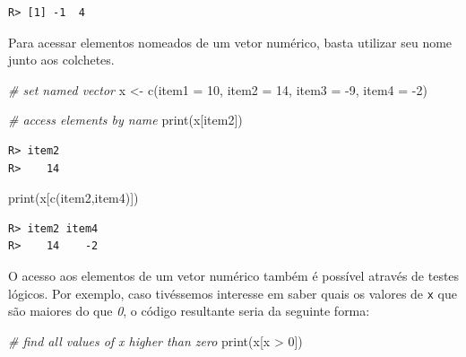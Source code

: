 \documentclass[
  11pt,
]{book}
\newenvironment{Shaded}{\begin{snugshade}}{\end{snugshade}}
\newcommand{\AttributeTok}[1]{\textcolor[rgb]{0.61,0.61,0.61}{#1}}
\newcommand{\CommentTok}[1]{\textcolor[rgb]{0.37,0.37,0.37}{\textit{#1}}}
\newcommand{\DecValTok}[1]{\textcolor[rgb]{0.06,0.06,0.06}{#1}}
\newcommand{\FunctionTok}[1]{\textcolor[rgb]{0,0,0}{#1}}
\newcommand{\NormalTok}[1]{#1}
\newcommand{\OtherTok}[1]{\textcolor[rgb]{0.37,0.37,0.37}{#1}}
\newcommand{\SpecialCharTok}[1]{\textcolor[rgb]{0,0,0}{#1}}
\newcommand{\StringTok}[1]{\textcolor[rgb]{0.5,0.5,0.5}{#1}}
\begin{document}
\begin{verbatim}
R> [1] -1  4
\end{verbatim}

Para acessar elementos nomeados de um vetor numérico, basta utilizar seu nome junto aos colchetes.

\begin{Shaded}
\begin{Highlighting}[]
\CommentTok{\# set named vector}
\NormalTok{x }\OtherTok{\textless{}{-}} \FunctionTok{c}\NormalTok{(}\AttributeTok{item1 =} \DecValTok{10}\NormalTok{, }\AttributeTok{item2 =} \DecValTok{14}\NormalTok{, }\AttributeTok{item3 =} \SpecialCharTok{{-}}\DecValTok{9}\NormalTok{, }\AttributeTok{item4 =} \SpecialCharTok{{-}}\DecValTok{2}\NormalTok{)}

\CommentTok{\# access elements by name}
\FunctionTok{print}\NormalTok{(x[}\StringTok{\textquotesingle{}item2\textquotesingle{}}\NormalTok{])}
\end{Highlighting}
\end{Shaded}

\begin{verbatim}
R> item2 
R>    14
\end{verbatim}

\begin{Shaded}
\begin{Highlighting}[]
\FunctionTok{print}\NormalTok{(x[}\FunctionTok{c}\NormalTok{(}\StringTok{\textquotesingle{}item2\textquotesingle{}}\NormalTok{,}\StringTok{\textquotesingle{}item4\textquotesingle{}}\NormalTok{)])}
\end{Highlighting}
\end{Shaded}

\begin{verbatim}
R> item2 item4 
R>    14    -2
\end{verbatim}

O acesso aos elementos de um vetor numérico também é possível através de testes lógicos. Por exemplo, caso tivéssemos interesse em saber quais os valores de \texttt{x} que são maiores do que \emph{0}, o código resultante seria da seguinte forma:

\begin{Shaded}
\begin{Highlighting}[]
\CommentTok{\# find all values of x higher than zero}
\FunctionTok{print}\NormalTok{(x[x }\SpecialCharTok{\textgreater{}} \DecValTok{0}\NormalTok{])}
\end{Highlighting}
\end{Shaded}
\end{document}
